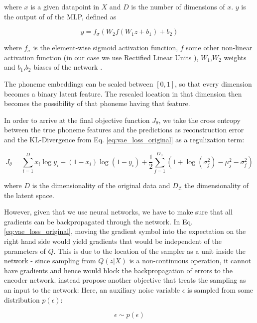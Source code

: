 \documentclass[6pt]{article}
\begin{document}
where $x$ is a given datapoint in $X$ and $D$ is the number of dimensions of $x$. $y$ is the output of of the MLP, defined as 

\begin{equation}
y = f_\sigma (W_2 f(W_1 z + b_1 ) + b_2)
\end{equation}

where $f_\sigma$ is the element-wise sigmoid activation function, $f$ some other non-linear activation function (in our case we use Rectified Linear Units \citep{nair2010rectified}), $W_1$,$W_2$ weights and $b_1$,$b_2$ biases of the network \citep[p. 11]{kingma2013auto}.

The phoneme embeddings  can be scaled between $[0,1]$, so that every dimension becomes a binary latent feature. The rescaled location in that dimension then becomes the possibility of that phoneme having that feature. 

In order to arrive at the final objective function $J_\theta$, we take the cross entropy between the true phoneme features and the predictions as reconstruction error and the KL-Divergence from Eq. \ref{eq:vae_loss_original} as a regulization term:

\begin{equation}
J_\theta = \sum_{i=1}^{D} x_i \log y_i + (1-x_i) \log (1-y_i) + \frac{1}{2}\sum_{j=1}^{D_{\mathcal{Z}}}(1+\log(\sigma_j^2)-\mu_j^2-\sigma_j^2)
\end{equation}

where $D$ is the dimensionality of the original data and $D_{\mathcal{Z}}$ the dimensionality of the latent space.

However, given that we use neural networks, we have to make sure that all gradients can be backpropagated through the network. In Eq. \ref{eq:vae_loss_original}, moving the gradient symbol into the expectation on the right hand side would yield gradients that would be independent of the parameters of $Q$. This is due to the location of the sampler as a unit inside the network - since sampling from $Q(z|X)$ is a non-continuous operation, it cannot have gradients and hence would block the backpropagation of errors to the encoder network. \cite{kingma2013auto} instead propose another objective that treats the sampling as an input to the network: Here, an auxiliary noise variable $\epsilon$ is sampled from some distribution $p(\epsilon)$:

\begin{equation}
\epsilon \sim p(\epsilon)
\end{equation}
\end{document}
